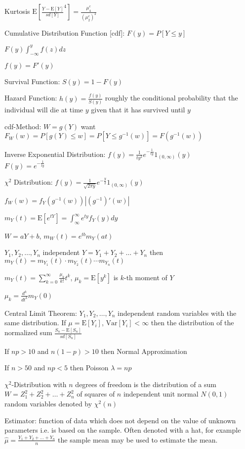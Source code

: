 Kurtosis $\text{E}[\frac{Y-\text{E}[Y]}{sd[Y]}^4]=\frac{\mu_4^c}{(\mu_2^c)^2}$

Cumulative Distribution Function [cdf]: $F(y)=P[Y\le y]$

$F(y)\int_{-\infty}^y f(z)dz$

$f(y)=F'(y)$

Survival Function: $S(y)=1-F(y)$

Hazard Function: $h(y)=\frac{f(y)}{S(y)}$ roughly the conditional probability that the individual will die at time $y$ given that it has survived until $y$

cdf-Method: $W=g(Y)$ want $F_W(w)=P[g(Y)\le w]=P[Y\le g^{-1}(w)]=F(g^{-1}(w))$

Inverse Exponential Distribution: $f(y)=\frac{1}{ty^2}e^{-\frac{1}{ty}}1_{(0,\infty)}(y)$ \\
$F(y)=e^{-\frac{1}{ty}}$

$\chi^2$ Distribution: $f(y)=\frac{1}{\sqrt{2\pi y}}e^{-\frac{y}{2}}1_{(0,\infty)}(y)$

$f_W(w)=f_Y(g^{-1}(w))|(g^{-1})'(w)|$

$m_Y(t)=\text{E}[e^{tY}]=\int_{\infty}^{\infty} e^{ty} f_Y(y) dy$

$W=aY+b$, $m_W(t)=e^{tb}m_Y(at)$

$Y_1, Y_2,\dots, Y_n$ independent $Y=Y_1+Y_2+\dots +Y_n$ then $m_Y(t)=m_{Y_1}(t)\cdot m_{Y_2}(t)\cdots m_{Y_n}(t)$

$m_Y(t)=\sum_{k=0}^{\infty} \frac{\mu_k}{k!} t^k$, $\mu_k=\text{E}[y^k]$ is $k$-th moment of $Y$

$\mu_k=\frac{d^k}{dt^k} m_Y(0)$

Central Limit Theorem: $Y_1,Y_2,\dots ,Y_n$ independent random variables with the same distribution. If $\mu=\text{E}[Y_i]$, $\text{Var}[Y_i]< \infty$ then the distribution of the normalized sum $\frac{S_n-\text{E}[S_n]}{sd[S_n]}$

If $np>10$ and $n(1-p)>10$ then Normal Approximation

If $n>50$ and $np<5$ then Poisson $\lambda=np$

$\chi^2$-Distribution with $n$ degrees of freedom is the distribution of a sum $W=Z_1^2+Z_2^2+\dots +Z_n^2$ of squares of $n$ independent unit normal $N(0,1)$ random variables denoted by $\chi^2 (n)$

Estimator: function of data which does not depend on the value of unknown parameters i.e. is based on the sample. Often denoted with a hat, for example $\hat{\mu}=\frac{Y_1+Y_2+\dots +Y_n}{n}$ the sample mean may be used to estimate the mean.

